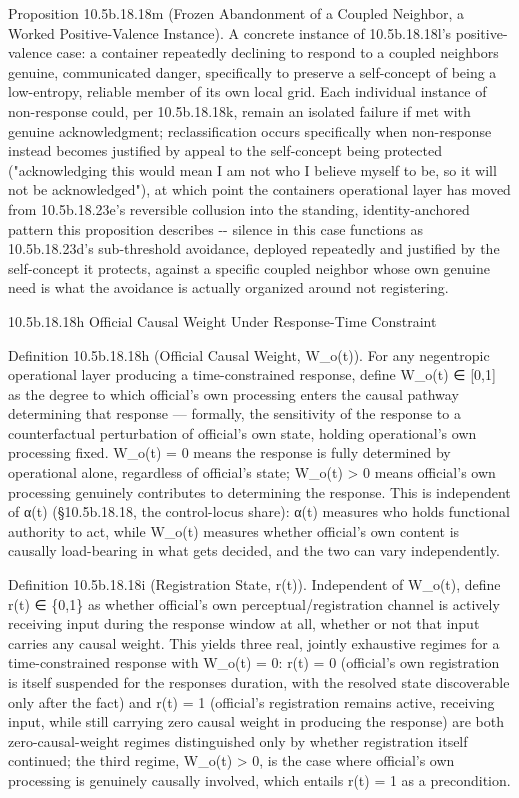 \documentclass[
]{article}
\begin{document}
Proposition 10.5b.18.18m (Frozen Abandonment of a Coupled Neighbor, a
Worked Positive-Valence Instance). A concrete instance of 10.5b.18.18l's
positive-valence case: a container repeatedly declining to respond to a
coupled neighbors genuine, communicated danger, specifically to preserve
a self-concept of being a low-entropy, reliable member of its own local
grid. Each individual instance of non-response could, per 10.5b.18.18k,
remain an isolated failure if met with genuine acknowledgment;
reclassification occurs specifically when non-response instead becomes
justified by appeal to the self-concept being protected ("acknowledging
this would mean I am not who I believe myself to be, so it will not be
acknowledged"), at which point the containers operational layer has
moved from 10.5b.18.23e's reversible collusion into the standing,
identity-anchored pattern this proposition describes -\/- silence in
this case functions as 10.5b.18.23d's sub-threshold avoidance, deployed
repeatedly and justified by the self-concept it protects, against a
specific coupled neighbor whose own genuine need is what the avoidance
is actually organized around not registering.

10.5b.18.18h Official Causal Weight Under Response-Time Constraint

Definition 10.5b.18.18h (Official Causal Weight, W\_o(t)). For any
negentropic operational layer producing a time-constrained response,
define W\_o(t) ∈ {[}0,1{]} as the degree to which official's own
processing enters the causal pathway determining that response ---
formally, the sensitivity of the response to a counterfactual
perturbation of official's own state, holding operational's own processing
fixed. W\_o(t) = 0 means the response is fully determined by operational
alone, regardless of official's state; W\_o(t) \textgreater{} 0 means
official's own processing genuinely contributes to determining the
response. This is independent of α(t) (§10.5b.18.18, the control-locus
share): α(t) measures who holds functional authority to act, while
W\_o(t) measures whether official's own content is causally load-bearing
in what gets decided, and the two can vary independently.

Definition 10.5b.18.18i (Registration State, r(t)). Independent of
W\_o(t), define r(t) ∈ \{0,1\} as whether official's own
perceptual/registration channel is actively receiving input during the
response window at all, whether or not that input carries any causal
weight. This yields three real, jointly exhaustive regimes for a
time-constrained response with W\_o(t) = 0: r(t) = 0 (official's own
registration is itself suspended for the responses duration, with the
resolved state discoverable only after the fact) and r(t) = 1 (official's
registration remains active, receiving input, while still carrying zero
causal weight in producing the response) are both zero-causal-weight
regimes distinguished only by whether registration itself continued; the
third regime, W\_o(t) \textgreater{} 0, is the case where official's own
processing is genuinely causally involved, which entails r(t) = 1 as a
precondition.
\end{document}
